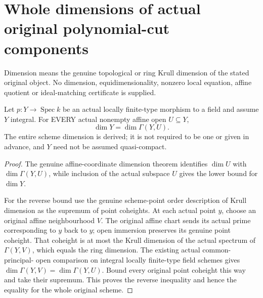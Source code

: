 \section{Whole dimensions of actual original polynomial-cut components}
Dimension means the genuine topological or ring Krull dimension of the
stated original object. No dimension, equidimensionality, nonzero local
equation, affine quotient or ideal-matching certificate is supplied.

\begin{theorem}
\label{thm:pl-gauss-original-whole-dimension-equals-affine}
\leanok
Let $p:Y\to\operatorname{Spec}k$ be an actual locally finite-type
morphism to a field and assume $Y$ integral. For EVERY actual nonempty
affine open $U\subseteq Y$,
\[
 \dim Y=\dim\Gamma(Y,U).
\]
The entire scheme dimension is derived; it is not required to be one
or given in advance, and $Y$ need not be assumed quasi-compact.
\end{theorem}
\begin{proof}
The genuine affine-coordinate dimension theorem identifies
$\dim U$ with $\dim\Gamma(Y,U)$, while inclusion of the actual
subspace $U$ gives the lower bound for $\dim Y$.

For the reverse bound use the genuine scheme-point order description
of Krull dimension as the supremum of point coheights. At each actual
point $y$, choose an original affine neighbourhood $V$. The original
affine chart sends its actual prime corresponding to $y$ back to $y$;
open immersion preserves its genuine point coheight. That coheight is
at most the Krull dimension of the actual spectrum of $\Gamma(Y,V)$,
which equals the ring dimension. The existing actual common-principal-
open comparison on integral locally finite-type field schemes gives
$\dim\Gamma(Y,V)=\dim\Gamma(Y,U)$. Bound every original point
coheight this way and take their supremum. This proves the reverse
inequality and hence the equality for the whole original scheme.
\end{proof}

